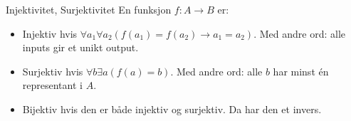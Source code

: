 \begin{frame}{Injektivitet, Surjektivitet}
    En funksjon $f : A \rightarrow B$ er:
    \begin{itemize}
        \item Injektiv hvis $\forall a_1 \forall a_2 (f(a_1) = f(a_2) \rightarrow a_1 = a_2)$.     Med andre ord: alle inputs gir et unikt output.\\
        \item Surjektiv hvis $\forall b \exists a (f(a) = b)$. Med andre ord: alle $b$ har minst én representant i $A$.
        \item Bijektiv hvis den er både injektiv og surjektiv. Da har den et invers.
    \end{itemize}
    \begin{figure}%
        \centering
        \qquad
        \qquad
        \qquad
        \label{fig:example1}%
    \end{figure}
\end{frame}

